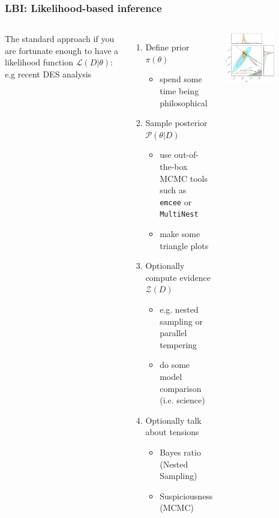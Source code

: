 \documentclass[aspectratio=169]{beamer}
\begin{document}
\begin{frame}
    \frametitle{LBI: Likelihood-based inference}
    \begin{columns}
        The standard approach if you are fortunate enough to have a likelihood function $\mathcal{L}(D|\theta)$: 
        e.g recent DES analysis 
        \begin{enumerate}
            \item Define prior $\pi(\theta)$ 
                \begin{itemize}
                    \item spend some time being philosophical
                \end{itemize}
            \item Sample posterior $\mathcal{P}(\theta|D)$ 
                \begin{itemize}
                    \item use out-of-the-box MCMC tools such as\\ \texttt{emcee} or \texttt{MultiNest}
                    \item make some triangle plots
                \end{itemize}
            \item Optionally compute evidence $\mathcal{Z}(D)$
                \begin{itemize}
                    \item e.g. nested sampling or parallel tempering
                    \item do some model comparison (i.e. science)
                \end{itemize}
            \item Optionally talk about tensions
                \begin{itemize}
                    \item Bayes ratio (Nested Sampling)
                    \item Suspiciousness (MCMC)~
                \end{itemize}
        \end{enumerate}
        \hfill\includegraphics[width=0.6\textwidth]{figures/des_parameters.pdf}

\end{columns}
\end{frame}
\end{document}
